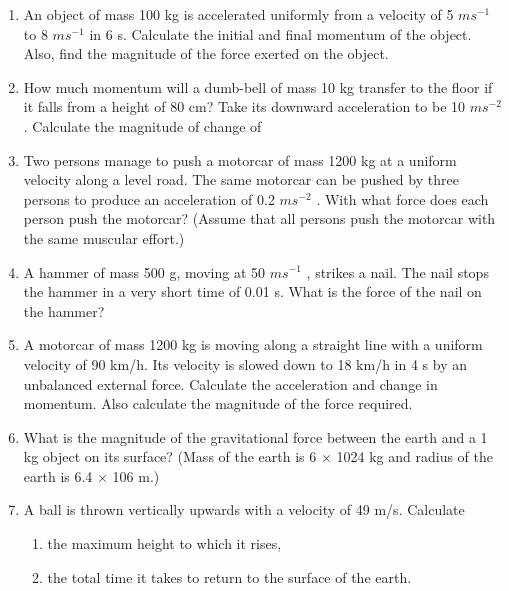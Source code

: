 \begin{enumerate}[label=\arabic*.,ref=\thesubsection.\theenumi]
\item  An object of mass 100 kg is accelerated uniformly from a velocity of 5 $m s^{-1}$
to 8 $m s^{-1}$ in 6 s. Calculate the initial and final
momentum of the object. Also, find the magnitude of the force exerted on the object.
\item  How much momentum will a dumb-bell of mass 10 kg transfer to the floor if it falls from a height of 80 cm? Take its downward acceleration to be 10 $m s^{-2}$. Calculate the magnitude of change of

\item Two persons manage to push a motorcar of mass 1200 kg at a uniform velocity along a level road. The same motorcar can be pushed by three persons to produce an acceleration of 0.2 $m s^{-2}$
. With what force does each person push the motorcar? (Assume that all persons push the motorcar with the same muscular effort.)
\item  A hammer of mass 500 g, moving at 50 $m s^{-1}$ , strikes a nail.
The nail stops the hammer in a very short time of 0.01 s. What is the force of the nail on the hammer?
\item  A motorcar of mass 1200 kg is moving along a straight line with a uniform velocity of 90 km/h. Its velocity is slowed down to 18 km/h in 4 s by an unbalanced external force. Calculate the acceleration and change in momentum. Also calculate the magnitude of the force required.
\item What is the magnitude of the gravitational force between the earth and a 1 kg object on its surface? (Mass of the earth is 6 $\times$ 1024 kg and radius of the earth is 6.4 $\times$ 106 m.)
\item A ball is thrown vertically upwards with a velocity of 49 m/s. Calculate

\begin{enumerate} 
\item  the maximum height to which it rises, 
\item the total time it takes to return to the surface of the earth.
\end{enumerate}


\end{enumerate}
